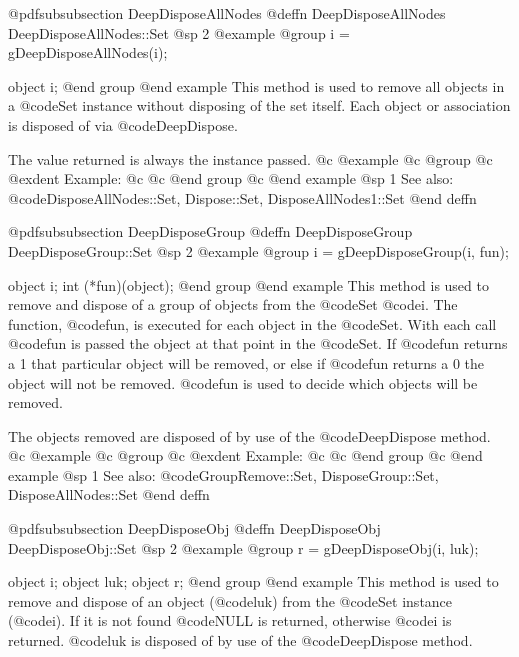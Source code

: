 @pdfsubsubsection {DeepDisposeAllNodes}
@deffn {DeepDisposeAllNodes} DeepDisposeAllNodes::Set
@sp 2
@example
@group
i = gDeepDisposeAllNodes(i);

object  i;
@end group
@end example
This method is used to remove all objects in a @code{Set} instance
without disposing of the set itself.  Each object or association
is disposed of via @code{DeepDispose}.

The value returned is always the instance passed.
@c @example
@c @group
@c @exdent Example:
@c 
@c @end group
@c @end example
@sp 1
See also:  @code{DisposeAllNodes::Set, Dispose::Set, DisposeAllNodes1::Set}
@end deffn





















@pdfsubsubsection {DeepDisposeGroup}
@deffn {DeepDisposeGroup} DeepDisposeGroup::Set
@sp 2
@example
@group
i = gDeepDisposeGroup(i, fun);

object  i;
int     (*fun)(object);
@end group
@end example
This method is used to remove and dispose of a group of objects from the
@code{Set} @code{i}.  The function, @code{fun}, is executed for each object in
the @code{Set}.  With each call @code{fun} is passed the object at that point
in the @code{Set}.  If @code{fun} returns a 1 that particular object will be
removed, or else if @code{fun} returns a 0 the object will not be
removed.  @code{fun} is used to decide which objects will be removed.

The objects removed are disposed of by use of the @code{DeepDispose} method.
@c @example
@c @group
@c @exdent Example:
@c 
@c @end group
@c @end example
@sp 1
See also:  @code{GroupRemove::Set, DisposeGroup::Set, DisposeAllNodes::Set}
@end deffn











@pdfsubsubsection {DeepDisposeObj}
@deffn {DeepDisposeObj} DeepDisposeObj::Set
@sp 2
@example
@group
r = gDeepDisposeObj(i, luk);

object  i;
object  luk;
object  r;
@end group
@end example
This method is used to remove and dispose of an object (@code{luk}) from
the @code{Set} instance (@code{i}).  If it is not found @code{NULL} is returned,
otherwise @code{i} is returned.  @code{luk} is disposed of by use of the
@code{DeepDispose} method.

